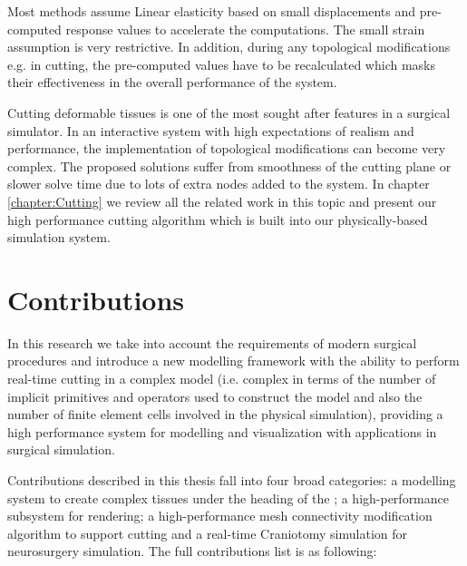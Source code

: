Most methods assume Linear elasticity based on small displacements and pre-computed 
response values to accelerate the computations. The small strain assumption is very restrictive. In 
addition, during any topological modifications e.g. in cutting, the pre-computed values 
have to be recalculated which masks their effectiveness in the overall performance of the system.

Cutting deformable tissues is one of the most sought after features in a surgical simulator. In an interactive 
system with high expectations of realism and performance, the implementation of topological 
modifications can become very complex. The proposed solutions suffer from smoothness of the cutting 
plane or slower solve time due to lots of extra nodes added to the system. In chapter 
\ref{chapter:Cutting} we review all the related work in this topic and present our high performance 
cutting algorithm which is built into our physically-based simulation system.


\section{Contributions}
\label{sec:contributions}
In this research we take into account the requirements of modern surgical procedures and introduce a 
new modelling framework with the ability to perform real-time cutting in a complex model (i.e. complex
in terms of the number of implicit primitives and operators used to construct the model 
and also the number of finite element cells involved in the physical simulation), providing a high 
performance system for modelling and visualization with applications in surgical simulation. 

Contributions described in this thesis fall into four broad categories: a modelling system to create 
complex tissues under the heading of the \blob; a high-performance subsystem for 
rendering; a high-performance mesh connectivity modification algorithm to support cutting and a  
real-time Craniotomy simulation for neurosurgery simulation. The full contributions list is as 
following:

